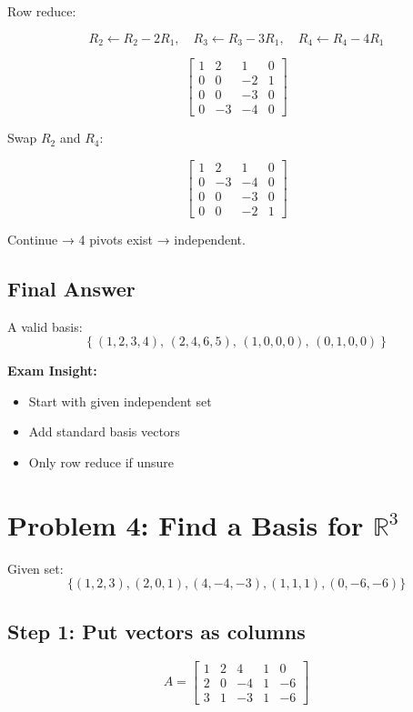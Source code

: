 \documentclass[11pt]{article}
\begin{document}
Row reduce:

\[
R_2 \leftarrow R_2 - 2R_1,\quad
R_3 \leftarrow R_3 - 3R_1,\quad
R_4 \leftarrow R_4 - 4R_1
\]

\[
\begin{bmatrix}
1 & 2 & 1 & 0 \\
0 & 0 & -2 & 1 \\
0 & 0 & -3 & 0 \\
0 & -3 & -4 & 0
\end{bmatrix}
\]

Swap $R_2$ and $R_4$:

\[
\begin{bmatrix}
1 & 2 & 1 & 0 \\
0 & -3 & -4 & 0 \\
0 & 0 & -3 & 0 \\
0 & 0 & -2 & 1
\end{bmatrix}
\]

Continue → 4 pivots exist → independent.

\subsection*{Final Answer}

A valid basis:
\[
\left\{
(1,2,3,4),\,
(2,4,6,5),\,
(1,0,0,0),\,
(0,1,0,0)
\right\}
\]

\textbf{Exam Insight:}
\begin{itemize}
    \item Start with given independent set
    \item Add standard basis vectors
    \item Only row reduce if unsure
\end{itemize}

\hrulefill

\section*{Problem 4: Find a Basis for $\mathbb{R}^3$}

Given set:
\[
\{(1,2,3), (2,0,1), (4,-4,-3), (1,1,1), (0,-6,-6)\}
\]

\subsection*{Step 1: Put vectors as columns}

\[
A =
\begin{bmatrix}
1 & 2 & 4 & 1 & 0 \\
2 & 0 & -4 & 1 & -6 \\
3 & 1 & -3 & 1 & -6
\end{bmatrix}
\]
\end{document}
